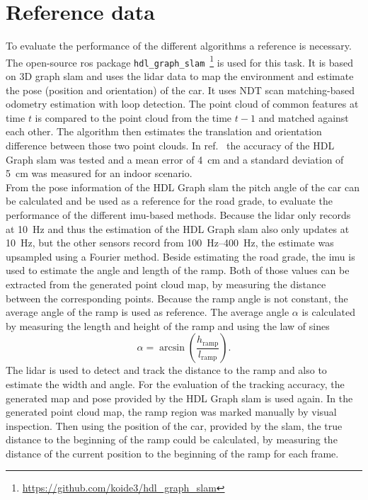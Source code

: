 \section{Reference data}
To evaluate the performance of the different algorithms a reference is necessary.
The open-source \gls{ros} package \texttt{hdl\_graph\_slam}~\footnote{\url{https://github.com/koide3/hdl_graph_slam}} is used for this task.
It is based on 3D graph \gls{slam} and uses the \gls{lidar} data to map the environment and estimate the pose (position and orientation) of the car.
It uses NDT scan matching-based odometry estimation with loop detection.
The point cloud of common features at time $t$ is compared to the point cloud from the time $t-1$ and matched against each other.
The algorithm then estimates the translation and orientation difference between those two point clouds.
In ref.~\cite{Akpnar2021} the accuracy of the HDL Graph \gls{slam} was tested and a mean error of \SI{4}{\cm} and a standard deviation of \SI{5}{\cm} was measured for an indoor scenario.\\
From the pose information of the HDL Graph \gls{slam} the pitch angle of the car can be calculated and be used as a reference for the road grade, to evaluate the performance of the different \gls{imu}-based methods.
Because the \gls{lidar} only records at \SI{10}{\hertz} and thus the estimation of the HDL Graph \gls{slam} also only updates at \SI{10}{\hertz}, but the other sensors record from \SIrange{100}{400}{\hertz}, the estimate was upsampled using a Fourier method.
Beside estimating the road grade, the \gls{imu} is used to estimate the angle and length of the ramp.
Both of those values can be extracted from the generated point cloud map, by measuring the distance between the corresponding points.
Because the ramp angle is not constant, the average angle of the ramp is used as reference.
The average angle $\alpha$ is calculated by measuring the length and height of the ramp and using the law of sines
\begin{equation}
	\alpha = \arcsin\left(\frac{h_\mathrm{ramp}}{l_\mathrm{ramp}}\right).
\end{equation}
The \gls{lidar} is used to detect and track the distance to the ramp and also to estimate the width and angle.
For the evaluation of the tracking accuracy, the generated map and pose provided by the HDL Graph \gls{slam} is used again.
In the generated point cloud map, the ramp region was marked manually by visual inspection.
Then using the position of the car, provided by the \gls{slam}, the true distance to the beginning of the ramp could be calculated, by measuring the distance of the current position to the beginning of the ramp for each frame.\\
